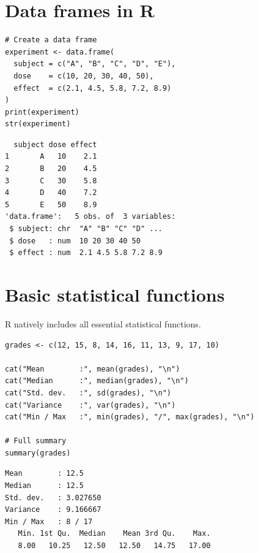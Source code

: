 \section{Data frames in R}

\begin{codeblock}[title=\textbf{R}]
\begin{verbatim}
# Create a data frame
experiment <- data.frame(
  subject = c("A", "B", "C", "D", "E"),
  dose    = c(10, 20, 30, 40, 50),
  effect  = c(2.1, 4.5, 5.8, 7.2, 8.9)
)
print(experiment)
str(experiment)
\end{verbatim}
\end{codeblock}

\begin{codeoutput}
\begin{verbatim}
  subject dose effect
1       A   10    2.1
2       B   20    4.5
3       C   30    5.8
4       D   40    7.2
5       E   50    8.9
'data.frame':	5 obs. of  3 variables:
 $ subject: chr  "A" "B" "C" "D" ...
 $ dose   : num  10 20 30 40 50
 $ effect : num  2.1 4.5 5.8 7.2 8.9
\end{verbatim}
\end{codeoutput}

\section{Basic statistical functions}

R natively includes all essential statistical functions.

\begin{codeblock}[title=\textbf{R}]
\begin{verbatim}
grades <- c(12, 15, 8, 14, 16, 11, 13, 9, 17, 10)

cat("Mean        :", mean(grades), "\n")
cat("Median      :", median(grades), "\n")
cat("Std. dev.   :", sd(grades), "\n")
cat("Variance    :", var(grades), "\n")
cat("Min / Max   :", min(grades), "/", max(grades), "\n")

# Full summary
summary(grades)
\end{verbatim}
\end{codeblock}

\begin{codeoutput}
\begin{verbatim}
Mean        : 12.5
Median      : 12.5
Std. dev.   : 3.027650
Variance    : 9.166667
Min / Max   : 8 / 17
   Min. 1st Qu.  Median    Mean 3rd Qu.    Max.
   8.00   10.25   12.50   12.50   14.75   17.00
\end{verbatim}
\end{codeoutput}

